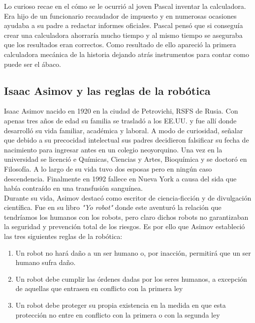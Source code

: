 Lo curioso recae en el cómo se le ocurrió al joven Pascal inventar la calculadora. Era hijo de un funcionario recaudador de impuesto y en numerosas ocasiones ayudaba a su padre a redactar informes oficiales. Pascal pensó que si conseguía crear una calculadora ahorraría mucho tiempo y al mismo tiempo se aseguraba que los resultados eran correctos. Como resultado de ello apareció la primera calculadora mecánica de la historia dejando atrás instrumentos para contar como puede ser el ábaco.





\subsection{Isaac Asimov y las reglas de la robótica}

Isaac Asimov nacido en 1920 en la ciudad de Petrovichi, RSFS de Rusia. Con apenas tres años de edad su familia se trasladó a los EE.UU. y fue allí donde desarrolló su vida familiar, académica y laboral. A modo de curiosidad, señalar que debido a su precocidad intelectual sus padres decidieron falsificar su fecha de nacimiento para ingresar antes en un colegio neoyorquino. Una vez en la universidad se licenció e Químicas, Ciencias y Artes, Bioquímica y se doctoró en Filosofía. A lo largo de su vida tuvo dos esposas pero en ningún caso descendencia. Finalmente en 1992 fallece en Nueva York a causa del sida que había contraído en una transfusión sanguínea.\\

Durante su vida, Asimov destacó como escritor de ciencia-ficción y de divulgación científica. Fue en su libro \textit{"Yo robot"} donde este aventuró la relación que tendríamos los humanos con los robots, pero claro dichos robots no garantizaban la seguridad y prevención total de los riesgos. Es por ello que Asimov estableció las tres siguientes reglas de la robótica:

\begin{enumerate}
\item Un robot no hará daño a un ser humano o, por inacción, permitirá que un ser humano sufra daño.
\item Un robot debe cumplir las órdenes dadas por los seres humanos, a excepción de aquellas que entrasen en conflicto con la primera ley
\item Un robot debe proteger su propia existencia en la medida en que esta protección no entre en conflicto con la primera o con la segunda ley
\end{enumerate}

